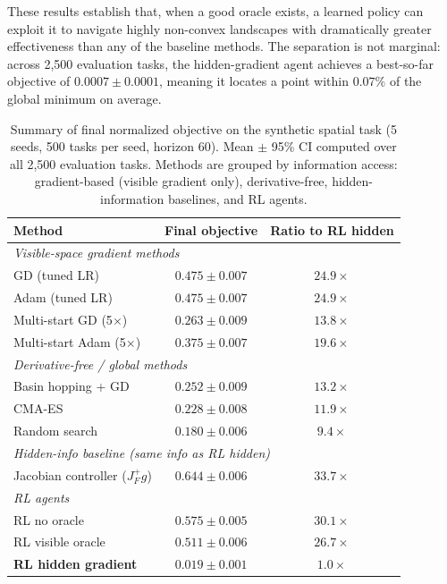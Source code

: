 \documentclass[10pt]{article}
\theoremstyle{definition}
\begin{document}
These results establish that, when a good oracle exists, a learned policy can exploit it to navigate highly non-convex landscapes with dramatically greater effectiveness than any of the baseline methods. The separation is not marginal: across 2{,}500 evaluation tasks, the hidden-gradient agent achieves a best-so-far objective of $0.0007 \pm 0.0001$, meaning it locates a point within $0.07\%$ of the global minimum on average.

\begin{table}[t]
    \centering
    \caption{Summary of final normalized objective on the synthetic spatial task (5 seeds, 500 tasks per seed, horizon 60). Mean $\pm$ 95\% CI computed over all 2{,}500 evaluation tasks. Methods are grouped by information access: gradient-based (visible gradient only), derivative-free, hidden-information baselines, and RL agents.}
    \label{tab:spatial_results}
    \begin{tabular}{lcc}
        \toprule
        \textbf{Method} & \textbf{Final objective} & \textbf{Ratio to RL hidden} \\
        \midrule
        \multicolumn{3}{l}{\emph{Visible-space gradient methods}} \\
        GD (tuned LR)          & $0.475 \pm 0.007$ & $24.9\times$ \\
        Adam (tuned LR)        & $0.475 \pm 0.007$ & $24.9\times$ \\
        Multi-start GD (5$\times$)  & $0.263 \pm 0.009$ & $13.8\times$ \\
        Multi-start Adam (5$\times$) & $0.375 \pm 0.007$ & $19.6\times$ \\
        \midrule
        \multicolumn{3}{l}{\emph{Derivative-free / global methods}} \\
        Basin hopping + GD     & $0.252 \pm 0.009$ & $13.2\times$ \\
        CMA-ES                 & $0.228 \pm 0.008$ & $11.9\times$ \\
        Random search          & $0.180 \pm 0.006$ & $9.4\times$ \\
        \midrule
        \multicolumn{3}{l}{\emph{Hidden-info baseline (same info as RL hidden)}} \\
        Jacobian controller ($J_F^+ g$) & $0.644 \pm 0.006$ & $33.7\times$ \\
        \midrule
        \multicolumn{3}{l}{\emph{RL agents}} \\
        RL no oracle           & $0.575 \pm 0.005$ & $30.1\times$ \\
        RL visible oracle      & $0.511 \pm 0.006$ & $26.7\times$ \\
        \textbf{RL hidden gradient} & $\bm{0.019 \pm 0.001}$ & $1.0\times$ \\
        \bottomrule
    \end{tabular}
\end{table}
\end{document}
